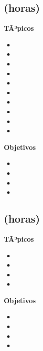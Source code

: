 \subsection{\DSTRESDef  (\DSTRESHours horas)}\label{sec:BOK-DS3}

\textbf{TÃ³picos}
\begin{itemize}
	\item \DSTRESTopicNociones
	\item \DSTRESTopicEstructura
	\item \DSTRESTopicPruebas
	\item \DSTRESTopicPruebasy
	\item \DSTRESTopicPruebaspor
	\item \DSTRESTopicPruebasporcontradiccion
	\item \DSTRESTopicInduccion
	\item \DSTRESTopicInduccionfuerte
	\item \DSTRESTopicDefiniciones
	\item \DSTRESTopicEl
\end{itemize}

\textbf{Objetivos}
\begin{itemize}
	\item \DSTRESObjUNO
	\item \DSTRESObjDOS
	\item \DSTRESObjTRES
	\item \DSTRESObjCUATRO
\end{itemize}

\subsection{\DSCUATRODef  (\DSCUATROHours horas)}\label{sec:BOK-DS4}

\textbf{TÃ³picos}
\begin{itemize}
	\item \DSCUATROTopicArgumentos
	\item \DSCUATROTopicPrincipio
	\item \DSCUATROTopicPermutaciones
	\item \DSCUATROTopicSolucion
\end{itemize}

\textbf{Objetivos}
\begin{itemize}
	\item \DSCUATROObjUNO
	\item \DSCUATROObjDOS
	\item \DSCUATROObjTRES
	\item \DSCUATROObjCUATRO
\end{itemize}

